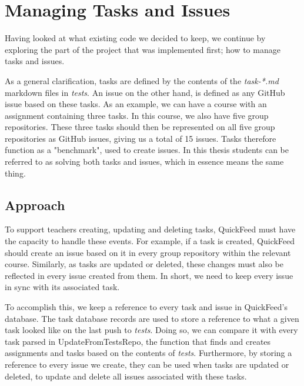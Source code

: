 \section{Managing Tasks and Issues}

Having looked at what existing code we decided to keep, we continue by exploring the part of the project that was implemented first; how to manage tasks and issues.

As a general clarification, tasks are defined by the contents of the \textit{task-*.md} markdown files in \textit{tests}.
An issue on the other hand, is defined as any GitHub issue based on these tasks.
As an example, we can have a course with an assignment containing three tasks.
In this course, we also have five group repositories.
These three tasks should then be represented on all five group repositories as GitHub issues, giving us a total of 15 issues.
Tasks therefore function as a "benchmark", used to create issues.
In this thesis students can be referred to as solving both tasks and issues, which in essence means the same thing.

\subsection{Approach}

To support teachers creating, updating and deleting tasks, QuickFeed must have the capacity to handle these events.
For example, if a task is created, QuickFeed should create an issue based on it in every group repository within the relevant course.
Similarly, as tasks are updated or deleted, these changes must also be reflected in every issue created from them.
In short, we need to keep every issue in sync with its associated task.

To accomplish this, we keep a reference to every task and issue in QuickFeed's database.
The task database records are used to store a reference to what a given task looked like on the last push to \textit{tests}.
Doing so, we can compare it with every task parsed in UpdateFromTestsRepo, the function that finds and creates assignments and tasks based on the contents of \textit{tests}.
Furthermore, by storing a reference to every issue we create, they can be used when tasks are updated or deleted, to update and delete all issues associated with these tasks.

